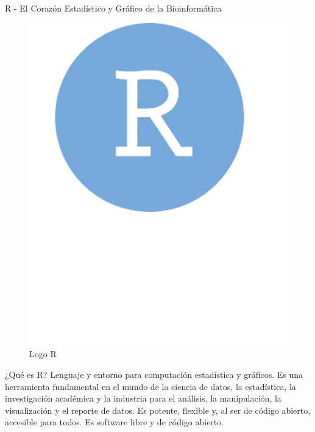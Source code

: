 \documentclass[11pt]{beamer}
\begin{document}

	\begin{frame}{R - El Corazón Estadístico y Gráfico de la Bioinformática}
		\begin{figure} %
    		\centering %
    		\includegraphics[width=1 \linewidth]{R31.png} %
    		\caption{Logo R} %
    		\label{fig:R} %
		\end{figure}
¿Qué es R? Lenguaje y entorno para computación estadística y gráficos.
Es una herramienta fundamental en el mundo de la ciencia de datos, la estadística, la investigación académica y la industria para el análisis, la manipulación, la visualización y el reporte de datos. Es potente, flexible y, al ser de código abierto, accesible para todos.
Es software libre y de código abierto.
	\end{frame}
	
\end{document}
